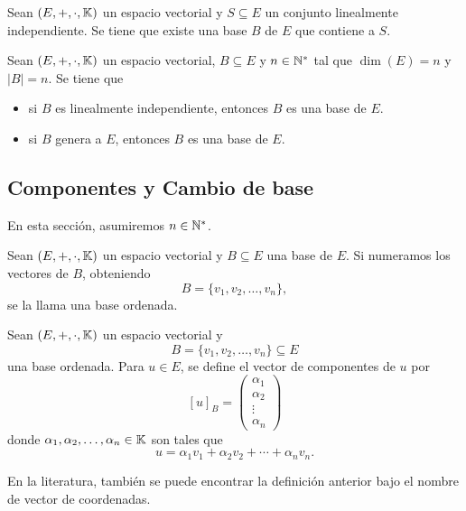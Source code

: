 \documentclass[a4,11pt]{aleph-notas}
\begin{document}
\begin{teo}
    Sean $(E,+,\cdot,\mathbb{K})$ un espacio vectorial y $S\subseteq E$ un conjunto linealmente independiente. Se tiene que existe una base $B$ de $E$ que contiene a $S$.
\end{teo}


\begin{teo}
    Sean $(E,+,\cdot,\mathbb{K})$ un espacio vectorial, $B\subseteq E$ y $n\in\mathbb{N}^*$ tal que $\dim(E)=n$ y $|B|=n$. Se tiene que
    \begin{itemize}
    \item
        si $B$ es linealmente independiente, entonces $B$ es una base de $E$.
    \item
        si $B$ genera a $E$, entonces $B$ es una base de $E$.
    \end{itemize}
\end{teo}


\subsection{Componentes y Cambio de base}

En esta sección, asumiremos $n\in\mathbb{N}^*$.

\begin{defi}
    Sean $(E,+,\cdot,\mathbb{K})$ un espacio vectorial y $B\subseteq E$ una base de $E$. Si numeramos los vectores de $B$, obteniendo
    \[
        B = \{v_1,v_2,\ldots,v_n\},
    \]
    se la llama una base ordenada.
\end{defi}

\begin{defi}
    Sean $(E,+,\cdot,\mathbb{K})$ un espacio vectorial y 
    \[
        B = \{v_1,v_2,\ldots,v_n\}\subseteq E
    \]
    una base ordenada. Para $u\in E$, se define el vector de componentes de $u$ por
    \[
        [u]_B = \begin{pmatrix}
            \alpha_1\\\alpha_2\\\vdots\\\alpha_n
        \end{pmatrix}
    \]
    donde $\alpha_1,\alpha_2,\ldots,\alpha_n\in\mathbb{K}$ son tales que
    \[
        u = \alpha_1 v_1+\alpha_2 v_2+\cdots+\alpha_n v_n.
    \]
\end{defi}

\begin{advertencia}
    En la literatura, también se puede encontrar la definición anterior bajo el nombre de vector de coordenadas.
\end{advertencia}
\end{document}
